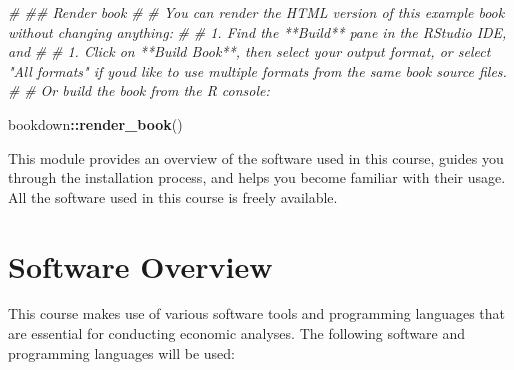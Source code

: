 \documentclass[
]{book}
\newenvironment{Shaded}{\begin{snugshade}}{\end{snugshade}}
\newcommand{\CommentTok}[1]{\textcolor[rgb]{0.56,0.35,0.01}{\textit{#1}}}
\newcommand{\FunctionTok}[1]{\textcolor[rgb]{0.13,0.29,0.53}{\textbf{#1}}}
\newcommand{\NormalTok}[1]{#1}
\newcommand{\SpecialCharTok}[1]{\textcolor[rgb]{0.81,0.36,0.00}{\textbf{#1}}}
\begin{document}
\begin{Shaded}
\begin{Highlighting}[]
\CommentTok{\# \#\# Render book}
\CommentTok{\# }
\CommentTok{\# You can render the HTML version of this example book without changing anything:}
\CommentTok{\# }
\CommentTok{\# 1. Find the **Build** pane in the RStudio IDE, and}
\CommentTok{\# }
\CommentTok{\# 1. Click on **Build Book**, then select your output format, or select "All formats" if you\textquotesingle{}d like to use multiple formats from the same book source files.}
\CommentTok{\# }
\CommentTok{\# Or build the book from the R console:}

\NormalTok{bookdown}\SpecialCharTok{::}\FunctionTok{render\_book}\NormalTok{()}
\end{Highlighting}
\end{Shaded}

This module provides an overview of the software used in this course, guides you through the installation process, and helps you become familiar with their usage. All the software used in this course is freely available.

\hypertarget{software-overview}{%
\chapter{Software Overview}\label{software-overview}}

This course makes use of various software tools and programming languages that are essential for conducting economic analyses. The following software and programming languages will be used:
\end{document}
